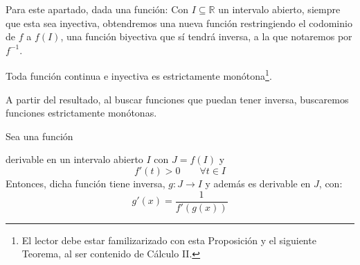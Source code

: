 Para este apartado, dada una función:
Con $I\subseteq \mathbb{R}$ un intervalo abierto, siempre que esta sea inyectiva, obtendremos una nueva función restringiendo el codominio de $f$ a $f(I)$, una función biyectiva que sí tendrá inversa, a la que notaremos por $f^{-1}$.

\begin{prop}
    Toda función continua e inyectiva es estrictamente monótona\footnote{El lector debe estar familizarizado con esta Proposición y el siguiente Teorema, al ser contenido de Cálculo II.}.
\end{prop}
A partir del resultado, al buscar funciones que puedan tener inversa, buscaremos funciones estrictamente monótonas.

\begin{teo}\label{teo:funcion_inversa}
    Sea una función

    derivable en un intervalo abierto $I$ con $J=f(I)$ y
    \begin{equation*}
        f'(t) > 0 \qquad \forall t\in I
    \end{equation*}
    Entonces, dicha función tiene inversa, $g:J\rightarrow I$ y además es derivable en $J$, con:
    \begin{equation*}
        g'(x) = \dfrac{1}{f'(g(x))}
    \end{equation*}
\end{teo}

